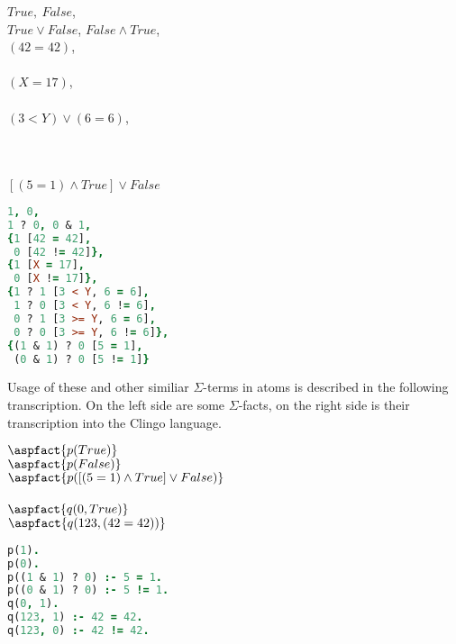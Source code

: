 \begin{example}
    \begin{minipage}{.45\textwidth}
        $True,\ False$,\\
        $True \vee False$, $False \wedge True$,\\
        $(42 = 42)$,\\
        \\
		$(X = 17)$,\\
        \\
        $(3 < Y) \vee (6 = 6)$,\\
        \\
        \\
        \\
        $[(5 = 1)\wedge True] \vee False$\\
    \end{minipage}
    \hfill
    \begin{minipage}{.5\textwidth}
        \begin{lstlisting}[language=Prolog, numbers=none, basicstyle=\normalsize]
1, 0,
1 ? 0, 0 & 1,
{1 [42 = 42],
 0 [42 != 42]},
{1 [X = 17],
 0 [X != 17]},
{1 ? 1 [3 < Y, 6 = 6],
 1 ? 0 [3 < Y, 6 != 6],
 0 ? 1 [3 >= Y, 6 = 6],
 0 ? 0 [3 >= Y, 6 != 6]},
{(1 & 1) ? 0 [5 = 1],
 (0 & 1) ? 0 [5 != 1]}
\end{lstlisting}
    \end{minipage}

    Usage of these and other similiar $\Sigma$-terms in atoms is described
	in the following transcription.
    On the left side are some $\Sigma$-facts, on the right side is their transcription into
    the Clingo language.

    \begin{minipage}{.45\textwidth}
        $\aspfact{p(True)}$\\
        $\aspfact{p(False)}$\\
        $\aspfact{p([(5 = 1) \wedge True] \vee False)}$\\
		\\
        $\aspfact{q(0, True)}$\\
        $\aspfact{q(123, (42 = 42))}$\\
    \end{minipage}
    \hfill
    \begin{minipage}{.5\textwidth}
        \begin{lstlisting}[language=Prolog, numbers=none, basicstyle=\normalsize]
p(1).
p(0).
p((1 & 1) ? 0) :- 5 = 1.
p((0 & 1) ? 0) :- 5 != 1.
q(0, 1).
q(123, 1) :- 42 = 42.
q(123, 0) :- 42 != 42.
\end{lstlisting}
    \end{minipage}
\end{example}

